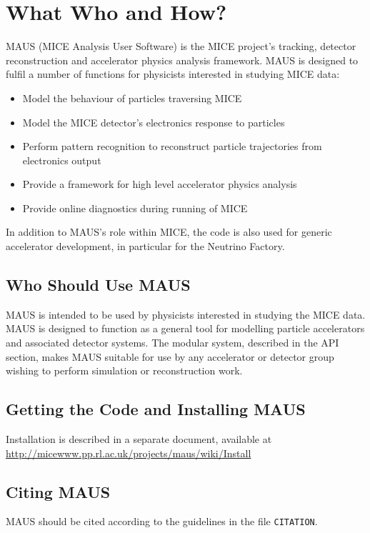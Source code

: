 \chapter{What Who and How?}
\label{chapter:introduction}
MAUS (MICE Analysis User Software) is the MICE project's tracking, detector reconstruction and accelerator physics analysis framework. MAUS is designed to fulfil a number of functions for physicists interested in studying MICE data:

\begin{itemize}
\item Model the behaviour of particles traversing MICE
\item Model the MICE detector's electronics response to particles
\item Perform pattern recognition to reconstruct particle trajectories from electronics output
\item Provide a framework for high level accelerator physics analysis
\item Provide online diagnostics during running of MICE
\end{itemize}

In addition to MAUS's role within MICE, the code is also used for generic accelerator development, in particular for the Neutrino Factory.

\section{Who Should Use MAUS}
MAUS is intended to be used by physicists interested in studying the MICE data. MAUS is designed to function as a general tool for modelling particle accelerators and associated detector systems. The modular system, described in the API section, makes MAUS suitable for use by any accelerator or detector group wishing to perform simulation or reconstruction work.

\section{Getting the Code and Installing MAUS}
Installation is described in a separate document, available at \url{http://micewww.pp.rl.ac.uk/projects/maus/wiki/Install}

\section{Citing MAUS}
MAUS should be cited according to the guidelines in the file \verb|CITATION|.


